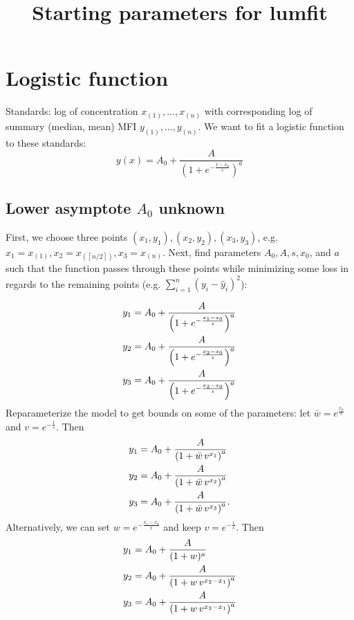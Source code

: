 \documentclass[12pt]{article}
\theoremstyle{remark}
\begin{document}
\title{Starting parameters for lumfit} 
\date{\vspace{-5ex}}
\maketitle

\section{Logistic function}

Standards: log of concentration $x_{(1)}, \dotsc, x_{(n)}$ with
corresponding log of summary (median, mean) MFI $y_{(1)}, \dotsc,
y_{(n)}$. We want to fit a logistic function to these standards: 
\begin{equation} \label{eq:logistic}
 y(x) = A_0 + \frac{A}{\left(1 + e^{-\frac{x - x_0}{s}} \right)^a}
\end{equation}

\subsection{Lower asymptote $A_0$ unknown}

First, we choose three points $(x_{1}, y_{1}), (x_{2}, y_{2}),
(x_{3}, y_{3})$, e.g. $x_{1} = x_{(1)}, x_{2} = x_{(\left \lceil
    n/2 \right \rceil)}, x_{3} = x_{(n)}$. Next, find parameters $A_0, A,
s, x_0$, and $a$ such that the function passes through these points
while minimizing some loss in regards to the remaining points
(e.g. $\sum_{i = 1}^n (y_i - \hat{y}_i)^2$):

\begin{align}
  y_1 &= A_0 + \frac{A}{\left(1 + e^{-\frac{x_1 - x_0}{s}}
            \right)^a} \notag \\
  y_2 &= A_0 + \frac{A}{\left(1 + e^{-\frac{x_2 - x_0}{s}}
            \right)^a} \notag \\
  y_3 &= A_0 + \frac{A}{\left(1 + e^{-\frac{x_3 - x_0}{s}}
            \right)^a} 
\end{align}  
Reparameterize the model to get bounds on some of the parameters: let
$\bar{w} = e^{\frac{x_0}{s}}$ and $v = e^{-\frac{1}{s}}$. Then
\begin{align} \label{eq:ybarw}
  y_1 &= A_0 + \frac{A}{\left(1 + \bar{w} \, v^{x_1} \right)^a}
            \notag \\
  y_2 &= A_0 + \frac{A}{\left(1 + \bar{w} \, v^{x_2} \right)^a}
  \notag \\
  y_3 &= A_0 + \frac{A}{\left(1 + \bar{w} \, v^{x_3} \right)^a}.
\end{align}
Alternatively, we can set $w = e^{-\frac{x_1 - x_0}{x}}$ and keep
$v = e^{-\frac{1}{s}}$. Then
\begin{align} \label{eq:yw}
  y_1 &= A_0 + \frac{A}{(1 + w)^a} \notag \\
  y_2 &= A_0 + \frac{A}{\left(1 + w \, v^{x_2 - x_1}\right)^a}
            \notag \\
  y_3 &= A_0 + \frac{A}{\left(1 + w \, v^{x_3 - x_1}\right)^a}
\end{align}
\end{document}
